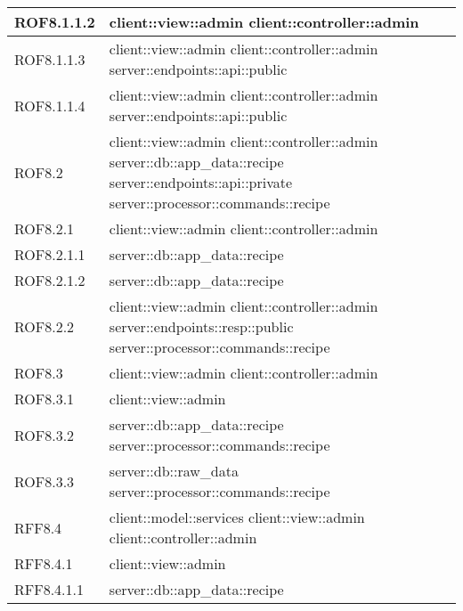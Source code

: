 \begin{center}
\begin{longtable}{| p{4cm} | p{8cm} |}
\hline
ROF8.1.1.2 & client::view::admin \newline client::controller::admin \\
\hline
ROF8.1.1.3 & client::view::admin \newline client::controller::admin \newline server::endpoints::api::public \\
\hline
ROF8.1.1.4 & client::view::admin \newline client::controller::admin \newline server::endpoints::api::public \\
\hline
ROF8.2 & client::view::admin \newline client::controller::admin \newline server::db::app\_data::recipe \newline server::endpoints::api::private \newline server::processor::commands::recipe \\
\hline
ROF8.2.1 & client::view::admin \newline client::controller::admin \\
\hline
ROF8.2.1.1 & server::db::app\_data::recipe \\
\hline
ROF8.2.1.2 & server::db::app\_data::recipe \\
\hline
ROF8.2.2 & client::view::admin \newline client::controller::admin \newline server::endpoints::resp::public \newline server::processor::commands::recipe \\
\hline
ROF8.3 & client::view::admin \newline client::controller::admin \\
\hline
ROF8.3.1 & client::view::admin \\
\hline
ROF8.3.2 & server::db::app\_data::recipe \newline server::processor::commands::recipe \\
\hline
ROF8.3.3 & server::db::raw\_data \newline server::processor::commands::recipe \\
\hline
RFF8.4 & client::model::services \newline client::view::admin \newline client::controller::admin \\
\hline
RFF8.4.1 & client::view::admin \\
\hline
RFF8.4.1.1 & server::db::app\_data::recipe \\

\end{longtable}
\end{center}
